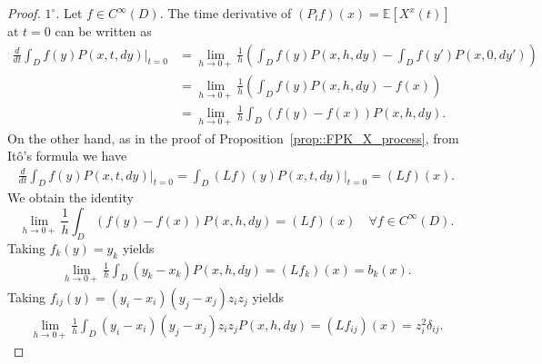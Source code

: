\documentclass[10pt,a4paper]{amsart}
\begin{document}
\begin{proof}
$1^{\circ}.$ Let $f\in C^{\infty}(D)$. The time derivative of $(P_{t}f)(x)=\mathbb{E}[X^{x}(t)]$ at $t=0$ can be written as 
    \begin{align*}
        \frac{d}{dt}\int_{ D}f(y)P(x,t,dy)\Big|_{t=0}
        &= \lim\limits_{h\to 0+}\frac{1}{h}\left(\int_{ D}f(y)P(x,h,dy) - \int_{ D}f(y')P(x,0,dy')\right) \\ 
        &=\lim\limits_{h\to 0+}\frac{1}{h}\left(\int_{ D}f(y)P(x,h,dy) -f(x)\right)  \\
        & = \lim\limits_{h\to 0+}\frac{1}{h}\int_{ D}\left(f(y)-f(x)\right)P(x,h,dy) .
    \end{align*}
On the other hand, as in the proof of Proposition~\ref{prop::FPK_X_process}, from Itô's formula we have
\begin{align*}
     \frac{d}{dt}\int_{ D}f(y)P(x,t,dy)\Big|_{t=0}
     = \int_{D}(Lf)(y)P(x,t,dy)\Big|_{t=0}
     = (Lf)(x).
\end{align*}
We obtain the identity
\[
    \lim\limits_{h\to 0+}\frac{1}{h}\int_{ D}\left(f(y)-f(x)\right)P(x,h,dy)  = (Lf)(x) \quad\forall f\in C^{\infty}(D).
\]
Taking $f_{k}(y)=y_{k}$ yields
\begin{align*}
\lim\limits_{h\to 0+}\frac{1}{h}\int_{ D}\left(y_{k}-x_{k}\right)P(x,h,dy) 
=(Lf_{k})(x)=b_{k}(x).
\end{align*}
Taking $f_{ij}(y) =(y_{i}-x_{i})(y_{j}-x_{j})z_{i}z_{j}$ yields
\begin{align*}
   \lim\limits_{h\to 0+}\frac{1}{h}\int_{ D}(y_{i}-x_{i})(y_{j}-x_{j})z_{i}z_{j}P(x,h,dy) =  (Lf_{ij})(x) = z_{i}^2\delta_{ij}.
\end{align*}


\end{proof}
\end{document}
